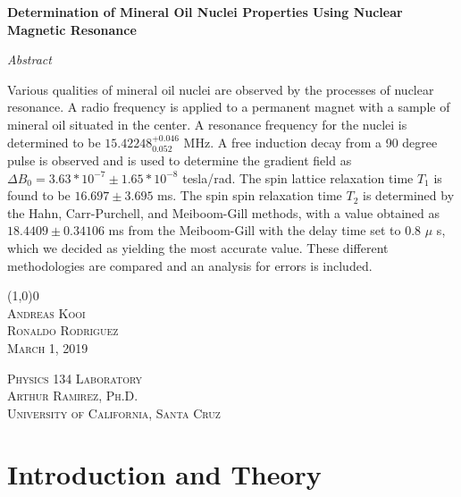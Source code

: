 \documentclass[]{report}
\begin{document}
\begin{titlepage}
	\begin{center}

	\huge{\bfseries Determination of Mineral Oil Nuclei Properties Using Nuclear Magnetic Resonance}\\
	
	\bigskip
		
	\textit{\Large Abstract}\\
	
	\medskip
	
	\normalsize 
	
Various qualities of mineral oil nuclei are observed by the processes of nuclear resonance. A radio frequency is applied to a permanent magnet with a sample of mineral oil situated in the center. A resonance frequency for the nuclei is determined to be $15.42248^{+0.046}_{0.052} $ MHz. A free induction decay from a 90 degree pulse is observed and is used to determine the gradient field as $\Delta B_{0} = 3.63*10^{-7} \pm 1.65*10^{-8}$ tesla/rad. The spin lattice relaxation time $T_{1}$ is found to be $16.697 \pm 3.695 $ ms. The spin spin relaxation time $T_{2}$ is determined by the Hahn, Carr-Purchell, and Meiboom-Gill methods, with a value obtained as $18.4409 \pm 0.34106 $ ms from the Meiboom-Gill with the delay time set to 0.8 $\mu$ s, which we decided as yielding the most accurate value. These different methodologies are compared and an analysis for errors is included.
	
	\line(1,0){0} \\

	\textsc{\normalsize Andreas Kooi \\
	Ronaldo Rodriguez \\}
	\textsc{\Large March 1, 2019}\\
	[4cm]
	\end{center}
	
	\begin{flushright}
	\textsc{\large 
	Physics 134 Laboratory \\
	Arthur Ramirez, Ph.D. \\
	University of California, Santa Cruz \\}
	
	\end{flushright}
	
\end{titlepage}



\section{Introduction and Theory}
\end{document}
